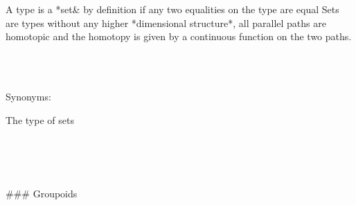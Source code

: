 A type is a *set& by definition if any two equalities on the type are equal Sets
are types without any higher *dimensional structure*,  all parallel paths are
homotopic and the homotopy is given by a continuous function on the two paths.

\begin{code}%
\>[0]\<%
\\
\>[0][@{}l@{\AgdaIndent{0}}]%
\>[2]\AgdaSymbol{:}\AgdaSpace{}%
\AgdaSpace{}%
\AgdaSpace{}%
\AgdaSpace{}%
\AgdaSpace{}%
\<%
\\
\>[0]\AgdaSpace{}%
\AgdaSpace{}%
\AgdaSymbol{=}\AgdaSpace{}%
\AgdaSymbol{(}\AgdaSpace{}%
\AgdaSpace{}%
\AgdaSymbol{:}\AgdaSpace{}%
\AgdaSymbol{)}\AgdaSpace{}%
\AgdaSpace{}%
\AgdaSpace{}%
\AgdaSymbol{(}\AgdaSpace{}%
\AgdaOperator{\AgdaDatatype{==}}\AgdaSpace{}%
\AgdaSymbol{)}\<%
\end{code}

Synonyms:

\begin{code}%
\>[0]\AgdaSpace{}%
\AgdaSymbol{=}\AgdaSpace{}%
\<%
\end{code}

The type of sets

\begin{code}%
\>[0]\<%
\\
\>[0][@{}l@{\AgdaIndent{0}}]%
\>[2]\AgdaSymbol{:}\AgdaSpace{}%
\AgdaSpace{}%
\AgdaSymbol{(}\AgdaSpace{}%
\AgdaSymbol{)}\<%
\\
%
\\[\AgdaEmptyExtraSkip]%
\>[0]\AgdaSpace{}%
\AgdaSymbol{\{}\AgdaSymbol{\}}\AgdaSpace{}%
\AgdaSymbol{=}\AgdaSpace{}%
\AgdaSpace{}%
\AgdaSymbol{(}\AgdaSpace{}%
\AgdaSymbol{)}\AgdaSpace{}%
\<%
\end{code}

### Groupoids

\begin{code}%
\>[0]\<%
\\
\>[0][@{}l@{\AgdaIndent{0}}]%
\>[2]\AgdaSymbol{:}\AgdaSpace{}%
\AgdaSpace{}%
\AgdaSpace{}%
\AgdaSpace{}%
\AgdaSpace{}%
\<%
\\
%
\\[\AgdaEmptyExtraSkip]%
\>[0]\AgdaSpace{}%
%
\>[14]\AgdaSymbol{=}\AgdaSpace{}%
\AgdaSymbol{(}\AgdaSpace{}%
\AgdaSpace{}%
\AgdaSymbol{:}\AgdaSpace{}%
\AgdaSymbol{)}\AgdaSpace{}%
\AgdaSpace{}%
\AgdaSpace{}%
\AgdaSymbol{(}\AgdaSpace{}%
\AgdaSpace{}%
\AgdaSymbol{)}\<%
\end{code}


